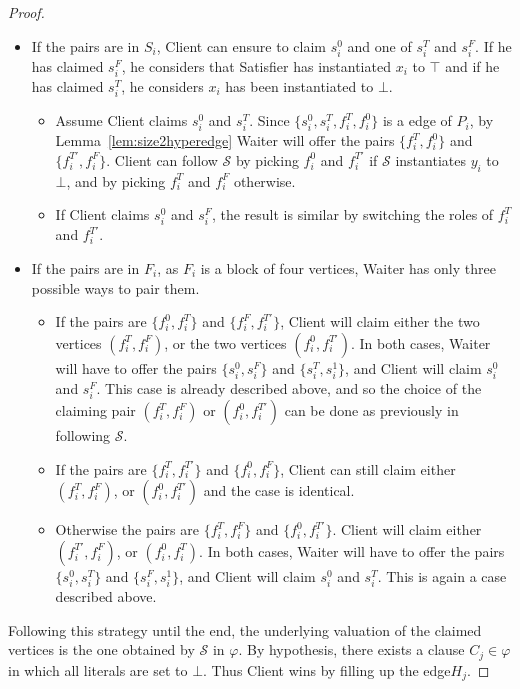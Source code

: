 \documentclass{article}
\newcommand{\strat}{\mathcal{S}}
\newcommand{\hedge}{edge\xspace}
\begin{document}
\begin{proof}
\begin{itemize}
    \item If the pairs are in $S_i$, Client can ensure to claim $s_i^0$ and one of $s_i^T$ and $s_i^F$. If he has claimed $s_i^F$, he considers that Satisfier has instantiated $x_i$ to $\top$ and if he has claimed $s_i^T$, he considers \(x_i\) has been instantiated to $\bot$. 
    \begin{itemize}
        \item Assume Client claims \(s_i^0\) and \(s_i^T\). Since \(\{s_i^0,s_i^T,f_i^T,f_i^0\}\) is a \hedge of \(P_i\), by Lemma~\ref{lem:size2hyperedge} Waiter will offer the pairs \(\{f_i^T,f_i^0\}\) and \(\{f_i^{T'},f_i^F\}\). 
        Client can follow $\strat$ by picking \(f_i^0\) and \(f_i^{T'}\) if $\strat$ instantiates \(y_i\) to \(\bot\), and by picking \(f_i^T\) and \(f_i^F\) otherwise.  
\item If Client claims \(s_i^0\) and \(s_i^{F}\), the result is similar by switching the roles of \(f_i^T\) and \(f_i^{T'}\). 
    \end{itemize}  
    \item If the pairs are in $F_i$, as $F_i$ is a block of four vertices, Waiter has only three possible ways to pair them.
    \begin{itemize}
        \item If the pairs are $\{f_i^0, f_i^T\}$ and $\{f_i^F, f_i^{T'}\}$, Client will claim either the two vertices \((f_i^{T},f_i^{F})\), or the two vertices \((f_i^0,f_i^{T'})\). In both cases, Waiter will have to offer the pairs \(\{s_i^0,s_i^F\}\) and \(\{s_i^{T},s_i^1\}\), and Client will claim \(s_i^0\) and \(s_i^F\). This case is already described above, and so the choice of the claiming pair \((f_i^{T},f_i^{F})\) or \((f_i^0,f_i^{T'})\) can be done as previously in following \(\strat\).
        \item If the pairs are $\{f_i^T, f_i^{T'}\}$ and $\{f_i^0, f_i^F\}$, Client can still claim either \((f_i^{T},f_i^{F})\), or \((f_i^0,f_i^{T'})\) and the case is identical.
        \item Otherwise the pairs are $\{f_i^T, f_i^F\}$ and $\{f_i^0, f_i^{T'}\}$. Client will claim either \((f_i^{T'},f_i^{F})\), or \((f_i^0,f_i^{T})\). In both cases, Waiter will have to offer the pairs \(\{s_i^0,s_i^T\}\) and \(\{s_i^{F},s_i^1\}\), and Client will claim \(s_i^0\) and \(s_i^T\). This is again a case described above.
\end{itemize}
\end{itemize}

Following this strategy until the end, the underlying valuation of the claimed vertices is the one obtained by $\strat$ in $\varphi$. By hypothesis, there exists a clause $C_j \in \varphi$ in which all literals are set to $\bot$. 
Thus Client wins by filling up the \hedge \(H_j\).
\end{proof}
\end{document}
